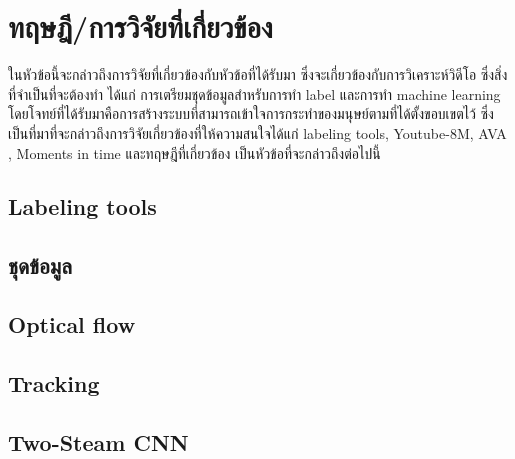\clearpage
\chapter{ทฤษฎี/การวิจัยที่เกี่ยวข้อง}
ในหัวข้อนี้จะกล่าวถึงการวิจัยที่เกี่ยวข้องกับหัวข้อที่ได้รับมา ซึ่งจะเกี่ยวข้องกับการวิเคราะห์วิดีโอ ซึ่งสิ่งที่จำเป็นที่จะต้องทำ ได้แก่ การเตรียมชุดข้อมูลสำหรับการทำ label และการทำ machine learning โดยโจทย์ที่ได้รับมาคือการสร้างระบบที่สามารถเข้าใจการกระทำของมนุษย์ตามที่ได้ตั้งขอบเขตไว้ ซึ่งเป็นที่มาที่จะกล่าวถึงการวิจัยเกี่ยวข้องที่ให้ความสนใจได้แก่ labeling tools, Youtube-8M, AVA , Moments in time และทฤษฎีที่เกี่ยวข้อง เป็นหัวข้อที่จะกล่าวถึงต่อไปนี้


\section{Labeling tools}


\clearpage
\section{ชุดข้อมูล}

\clearpage

\clearpage


\section{Optical flow}


\clearpage
\section{Tracking}


\section{Two-Steam CNN}


